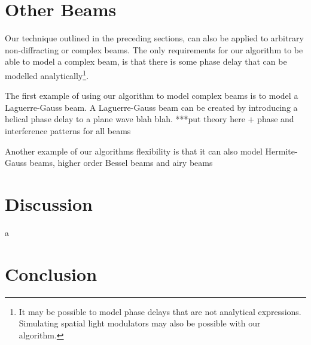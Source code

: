 \section{Other Beams}

Our technique outlined in the preceding sections, can also be applied to arbitrary non-diffracting or complex beams. The only requirements for our algorithm to be able to model a complex beam, is that there is some phase delay that can be modelled analytically\footnote{It may be possible to model phase delays that are not analytical expressions. Simulating spatial light modulators may also be possible with our algorithm.}.

The first example of using our algorithm to model complex beams is to model a Laguerre-Gauss beam. A Laguerre-Gauss beam can be created by introducing a helical phase delay to a plane wave blah blah. ***put theory here + phase and interference patterns for all beams

Another example of our algorithms flexibility is that it can also model Hermite-Gauss beams, higher order Bessel beams and airy beams

\section{Discussion}



a~\cite{mignon2016fractional}
\section{Conclusion}
